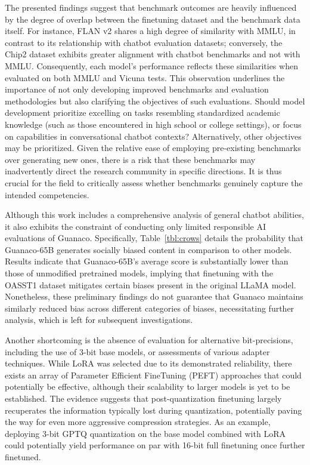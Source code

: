 The presented findings suggest that benchmark outcomes are heavily influenced by the degree of overlap between the finetuning dataset and the benchmark data itself. For instance, FLAN v2 shares a high degree of similarity with MMLU, in contrast to its relationship with chatbot evaluation datasets; conversely, the Chip2 dataset exhibits greater alignment with chatbot benchmarks and not with MMLU. Consequently, each model's performance reflects these similarities when evaluated on both MMLU and Vicuna tests. This observation underlines the importance of not only developing improved benchmarks and evaluation methodologies but also clarifying the objectives of such evaluations. Should model development prioritize excelling on tasks resembling standardized academic knowledge (such as those encountered in high school or college settings), or focus on capabilities in conversational chatbot contexts? Alternatively, other objectives may be prioritized. Given the relative ease of employing pre-existing benchmarks over generating new ones, there is a risk that these benchmarks may inadvertently direct the research community in specific directions. It is thus crucial for the field to critically assess whether benchmarks genuinely capture the intended competencies.

Although this work includes a comprehensive analysis of general chatbot abilities, it also exhibits the constraint of conducting only limited responsible AI evaluations of {Guanaco}. Specifically, Table~\ref{tbl:crows} details the probability that {Guanaco}-65B generates socially biased content in comparison to other models. Results indicate that {Guanaco}-65B's average score is substantially lower than those of unmodified pretrained models, implying that finetuning with the OASST1 dataset mitigates certain biases present in the original LLaMA model. Nonetheless, these preliminary findings do not guarantee that {Guanaco} maintains similarly reduced bias across different categories of biases, necessitating further analysis, which is left for subsequent investigations.

Another shortcoming is the absence of evaluation for alternative bit-precisions, including the use of 3-bit base models, or assessments of various adapter techniques. While LoRA was selected due to its demonstrated reliability, there exists an array of Parameter Efficient FineTuning (PEFT) approaches that could potentially be effective, although their scalability to larger models is yet to be established. The evidence suggests that post-quantization finetuning largely recuperates the information typically lost during quantization, potentially paving the way for even more aggressive compression strategies. As an example, deploying 3-bit GPTQ quantization on the base model combined with LoRA could potentially yield performance on par with 16-bit full finetuning once further finetuned.

